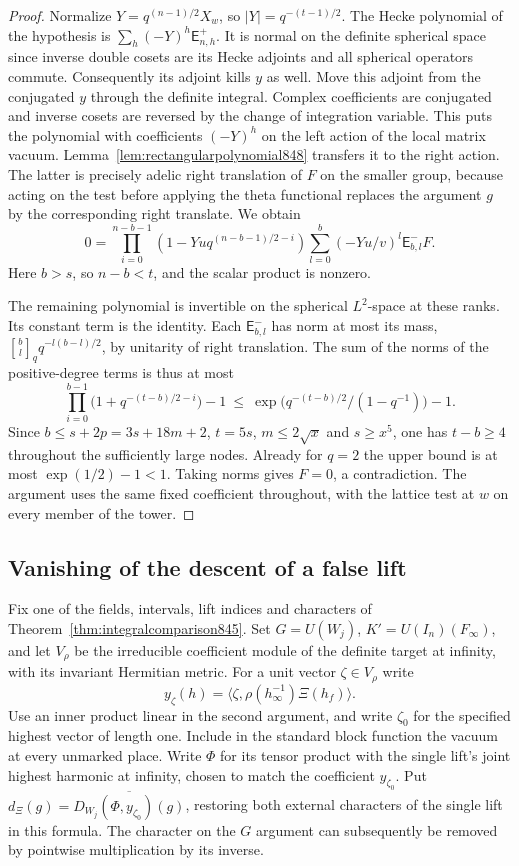 \documentclass[a4paper,11pt]{article}
\theoremstyle{definition}
\theoremstyle{remark}
\numberwithin{equation}{section}
\begin{document}
\begin{proof}
Normalize \(Y=q^{(n-1)/2}X_w\), so
\(|Y|=q^{-(t-1)/2}\). The Hecke polynomial of the hypothesis
is \(\sum_h(-Y)^h\mathsf E_{n,h}^+\).
It is normal on the definite spherical space since inverse
double cosets are its Hecke adjoints and all spherical operators
commute. Consequently its adjoint kills \(y\) as well.
Move this adjoint from the conjugated \(y\) through the definite
integral. Complex coefficients are conjugated and inverse
cosets are reversed by the change of integration variable. This
puts the polynomial with coefficients \((-Y)^h\) on the left
action of the local matrix vacuum. Lemma~\ref{lem:rectangularpolynomial848}
transfers it to the right action. The latter is precisely adelic
right translation of \(F\) on the smaller group, because acting
on the test before applying the theta functional replaces the
argument \(g\) by the corresponding right translate. We obtain
\[
 0=\prod_{i=0}^{n-b-1}(1-Yu q^{(n-b-1)/2-i})
          \sum_{l=0}^b(-Yu/v)^l\mathsf E_{b,l}^- F .
\]
Here \(b>s\), so \(n-b<t\), and the scalar product is nonzero.

The remaining polynomial is invertible on the spherical
\(L^2\)-space at these ranks. Its constant term is the identity.
Each \(\mathsf E_{b,l}^-\) has norm at most its mass,
\({b\brack l}_q q^{-l(b-l)/2}\), by unitarity of right
translation. The sum of the norms of the positive-degree terms
is thus at most
\[
 \prod_{i=0}^{b-1}\bigl(1+q^{-(t-b)/2-i}\bigr)-1
 \ \le\ \exp\bigl(q^{-(t-b)/2}/(1-q^{-1})\bigr)-1 .
\]
Since \(b\le s+2p=3s+18m+2\), \(t=5s\), \(m\le2\sqrt{x}\)
and \(s\ge x^5\), one has \(t-b\ge4\) throughout the sufficiently
large nodes. Already for \(q=2\) the upper bound is at most
\(\exp(1/2)-1<1\). Taking norms gives \(F=0\), a contradiction.
The argument uses the same fixed coefficient throughout, with
the lattice test at \(w\) on every member of the tower.
\end{proof}
\clearpage

\subsection{Vanishing of the descent of a false lift}
\label{sec:falsedescent849}
Fix one of the fields, intervals, lift indices and characters of
Theorem~\ref{thm:integralcomparison845}. Set
\(G=U(W_j)\), \(K'=U(I_n)(F_\infty)\), and let \(V_\rho\)
be the irreducible coefficient module of the definite target
at infinity, with its invariant Hermitian metric. For a
unit vector \(\zeta\in V_\rho\) write
\[
       y_\zeta(h)=\langle\zeta,\rho(h_\infty^{-1})\Xi(h_f)\rangle .
\]
Use an inner product linear in the second argument, and write
\(\zeta_0\) for the specified highest vector of length one.
Include in the standard block function the vacuum at every
unmarked place. Write \(\Phi\) for its tensor product with the
single lift's joint highest harmonic at infinity, chosen to
match the coefficient \(y_{\zeta_0}\). Put
\(d_\Xi(g)=\overline{D_{W_j}(\Phi,y_{\zeta_0})(g)}\), restoring
both external characters of the single lift in this formula.
The character on the \(G\) argument can subsequently be removed
by pointwise multiplication by its inverse.
\end{document}
